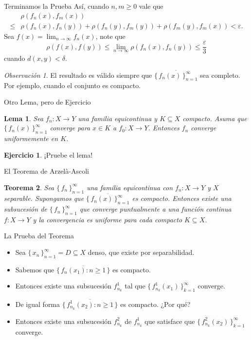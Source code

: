 \documentclass[utf8]{beamer}
\theoremstyle{plain}
\newtheorem{Th}{Teorema}               %
\newtheorem{Lem}{Lema}                 %
\theoremstyle{definition}
\newtheorem{Ej}{Ejercicio}             %
\theoremstyle{remark}
\newtheorem{Rmk}[Th]{Observación}      %
\numberwithin{equation}{section}
\newcommand{\dl}{\delta}                %
\newcommand{\eps}{\varepsilon}          %
\newcommand{\set}[1]{\{\,#1\,\}}    %
\renewcommand{\geq}{\geqslant}          %
\renewcommand{\leq}{\leqslant}          %
\newcommand{\ov}{\overline}
\newcommand{\suck}{_{k=1}^\infty} %
\newcommand{\sucn}{_{n=1}^\infty} %
\begin{document}
\begin{frame}{Terminamos la Prueba}
  Así, cuando $n,m\geq 0$ vale que
  \begin{align*}
    &\rho(f_n(x),f_m(x))\\
    \leq&\rho(f_n(x),f_n(y))+\rho(f_n(y),f_m(y))+\rho(f_m(y),f_m(x))<\eps.
  \end{align*}
  Sea $f(x)=\lim_{n\to\infty}f_n(x)$, note que 
  $$\rho(f(x),f(y))\leq\lim_{n\to\infty}\rho(f_n(x),f_n(y))\leq\frac{\eps}{3}$$
  cuando $d(x,y)<\dl$.
  \begin{Rmk}
    El resultado es válido siempre que $\ov{\set{f_n(x)}\sucn}$ sea completo. Por ejemplo, cuando el conjunto es compacto.
  \end{Rmk}
\end{frame}

\begin{frame}{Otro Lema, pero de Ejercicio}
\begin{Lem}\label{lem:equicontConvToUnif}
  Sea $f_n: X\to Y$ una familia equicontinua y $K\subseteq X$ compacto. Asuma que $\set{f_n(x)}\sucn$ converge para $x\in K$ a $f_0: X\to Y$. Entonces $f_n$ converge uniformemente en $K$.
\end{Lem}
\begin{Ej}
  ¡Pruebe el lema!
\end{Ej}
\end{frame}

\begin{frame}{El Teorema de Arzelà-Ascoli}
  \begin{Th}\label{thm:ArzelaAscoli}
    Sea $\set{f_n}\sucn$ una familia equicontinua con $f_n: X\to Y$ y $X$ separable. Supongamos que $\ov{\set{f_n(x)}\sucn}$ es compacto. Entonces existe una subsucesión de $\set{f_n}\sucn$ que converge puntualmente a una función continua $f: X\to Y$ y la convergencia es uniforme para cada compacto $K\subseteq X$. 
  \end{Th}
\end{frame}

\begin{frame}{La Prueba del Teorema}
  \begin{itemize}
    \item Sea $\set{x_n}\sucn=D\subseteq X$ denso, que existe por separabilidad. 
    \item Sabemos que $\ov{\set{f_n(x_1):n\geq 1}}$ es compacto. 
    \item Entonces existe una subsucesión $f_{n_k}^1$ tal que $\set{f_{n_k}^1(x_1)}\suck$ converge. 
    \item De igual forma $\ov{\set{f_{n_k}^1(x_2):n\geq 1}}$ es compacto. \alert{¿Por qué?}
    \item Entonces existe una subsucesión $f_{n_k}^2$ de $f_{n_k}^1$ que satisface que $\set{f_{n_k}^2(x_2)}\suck$ converge.
  \end{itemize}
\end{frame}
\end{document}
